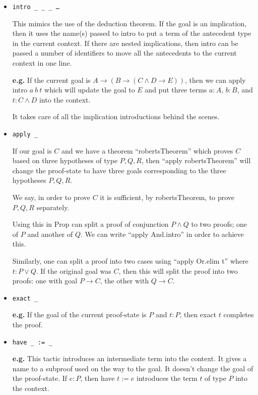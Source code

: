 \documentclass[12pt]{article}
\begin{document}
\begin{itemize}
  \item \texttt{intro \_ \_ \_ \dots}
  
  This mimics the use of the deduction theorem. If the goal is an implication, then it uses the name(s) passed to intro to put a term of the antecedent type in the current context. If there are nested implications, then intro can be passed a number of identifiers to move all the antecedents to the current context in one line. 
  
  {\bf e.g.} If the current goal is $A \to (B \to (C \land D \to E))$, then we can apply intro $a \ b \ t$ which will update the goal to $E$ and put three terms $a : A$, $b : B$, and $t : C\land D$ into the context. 
  
  It takes care of all the implication introductions behind the scenes.
  
  \item \texttt{apply \_}
  
  If our goal is $C$ and we have a theorem ``robertsTheorem'' which proves $C$ based on three hypotheses of type $P,Q,R$, then ``apply robertsTheorem'' will change the proof-state to have three goals corresponding to the three hypotheses $P,Q,R$. 
  
  We say, in order to prove $C$ it is sufficient, by robertsTheorem, to prove $P,Q,R$ separately. 
  
  Using this in Prop can split a proof of conjunction $P\land Q$ to two proofs; one of $P$ and another of $Q$. We can write ``apply And.intro'' in order to achieve this.  
  
  Similarly, one can split a proof into two cases using ``apply Or.elim t'' where $t : P \lor Q$. If the original goal was $C$, then this will split the proof into two proofs: one with goal $P \to C$, the other with $Q \to C$. 
  
  
  \item \texttt{exact \_}
  
  {\bf e.g.} If the goal of the current proof-state is $P$ and $t : P$, then exact $t$ completes the proof.
  
  \item \texttt{have \_ := \_}
  
  {\bf e.g.} This tactic introduces an intermediate term into the context. It gives a name to a subproof used on the way to the goal. It doesn't change the goal of the proof-state. If $e : P$, then have $t := e$ introduces the term $t$ of type $P$ into the context.
  

\end{itemize}
\end{document}
